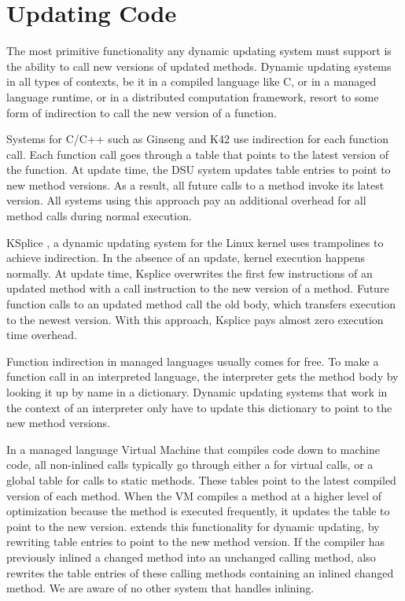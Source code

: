 
\section{Updating Code}

The most primitive functionality any dynamic updating system must support is
the ability to call new versions of updated methods.  Dynamic updating
systems in all types of contexts, be it in a compiled language like C, or
in a managed language runtime, or in a distributed computation framework,
resort to some form of indirection to call the new version of a
function.

Systems for C/C++ such as Ginseng \cite{neamtiu06dsu}
and K42 \cite{K42reconfig} use indirection for each function call. Each
function call goes through a table that points to the latest version of the
function. At update time, the DSU system updates table entries to point
to new method versions. As a result, all future calls to a method invoke
its latest version. All systems using this approach pay an additional
overhead for all method calls during normal execution.

KSplice \cite{ksplice}, a dynamic updating system for the Linux kernel uses
trampolines to achieve indirection. In the absence of an update, kernel
execution happens normally. At update time, Ksplice overwrites the first few
instructions of an updated method with a call instruction to the new
version of a method. Future function calls to an updated method call the
old body, which transfers execution to the newest version. With this
approach, Ksplice pays almost zero execution time overhead.

Function indirection in managed languages usually comes for free. To make a
function call in an interpreted language, the interpreter gets the method
body by looking it up by name in a dictionary. Dynamic updating systems
that work in the context of an interpreter only have to update this
dictionary to point to the new method versions.

In a managed language Virtual Machine that compiles code down to machine
code, all non-inlined calls typically go through either a \VMT for virtual
calls, or a global table for calls to static methods. These tables point to
the latest compiled version of each method. When the VM compiles a method
at a higher level of optimization because the method is executed
frequently, it updates the table to point to the new version.
\JV extends this functionality for dynamic updating, by rewriting table
entries to point to the new method version. If the compiler has previously
inlined a changed method into an unchanged calling method, \JV also
rewrites the table entries of these calling methods containing an inlined
changed method. We are aware of no other system that handles inlining.

